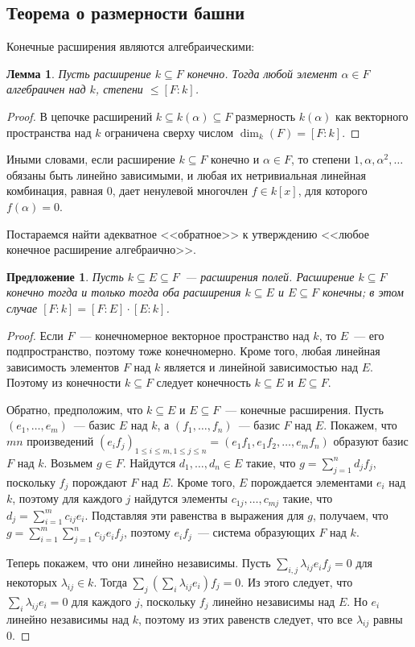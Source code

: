 \documentclass[a4paper,11pt]{scrartcl}
\theoremstyle{plain}
\newtheorem{proposition}[theorem]{Предложение}
\newtheorem{lemma}[theorem]{Лемма}
\theoremstyle{definition}
\newcommand\sseq{\subseteq}
\begin{document}
\subsection{Теорема о размерности башни}

Конечные расширения являются алгебраическими:

\begin{lemma}\label{finite_are_algebraic}
Пусть расширение $k\sseq F$ конечно. Тогда любой элемент $\alpha\in F$
алгебраичен над $k$, степени $\leq [F:k]$.
\end{lemma}
\begin{proof}
В цепочке расширений $k\sseq k(\alpha)\sseq F$ размерность $k(\alpha)$
как векторного пространства над $k$ ограничена сверху числом
$\dim_k(F)=[F:k]$.
\end{proof}

Иными словами, если расширение $k\sseq F$ конечно и $\alpha\in F$, то
степени $1,\alpha,\alpha^2,\dots$ обязаны быть линейно зависимыми, и
любая их нетривиальная линейная комбинация, равная $0$, дает ненулевой
многочлен $f\in k[x]$, для которого $f(\alpha)=0$.

Постараемся найти адекватное <<обратное>> к утверждению <<любое
конечное расширение алгебраично>>.

\begin{proposition}
Пусть $k\sseq E\sseq F$~--- расширения полей. Расширение $k\sseq F$
конечно тогда и только тогда оба расширения $k\sseq E$ и $E\sseq F$
конечны; в этом случае $[F:k]=[F:E]\cdot [E:k]$.
\end{proposition}
\begin{proof}
Если $F$~--- конечномерное векторное пространство над $k$, то $E$~---
его подпространство, поэтому тоже конечномерно. Кроме того, любая
линейная зависимость элементов $F$ над $k$ является и линейной
зависимостью над $E$. Поэтому из конечности $k\sseq F$ следует
конечность $k\sseq E$ и $E\sseq F$.

Обратно, предположим, что $k\sseq E$ и $E\sseq F$~--- конечные
расширения. Пусть $(e_1,\dots,e_m)$~--- базис $E$ над $k$, а
$(f_1,\dots,f_n)$~--- базис $F$ над $E$. Покажем, что $mn$
произведений $(e_if_j)_{1\leq i\leq m,1\leq j\leq n} =
(e_1f_1,e_1f_2,\dots,e_mf_n)$ образуют базис $F$ над $k$. Возьмем
$g\in F$. Найдутся $d_1,\dots,d_n\in E$ такие, что
$g=\sum_{j=1}^nd_jf_j$, поскольку $f_j$ порождают $F$ над $E$. Кроме
того, $E$ порождается элементами $e_i$ над $k$, поэтому для каждого
$j$ найдутся элементы $c_{1j},\dots,c_{mj}$ такие, что $d_j=\sum_{i=1}^m
c_{ij}e_i$. Подставляя эти равенства в выражения для $g$, получаем,
что $g=\sum_{i=1}^m\sum_{j=1}^n c_{ij}e_if_j$, поэтому $e_if_j$~---
система образующих $F$ над $k$.

Теперь покажем, что они линейно независимы. Пусть
$\sum_{i,j}\lambda_{ij}e_if_j=0$ для некоторых $\lambda_{ij}\in k$.
Тогда $\sum_j(\sum_i\lambda_{ij}e_i)f_j=0$. Из этого следует, что
$\sum_i\lambda_{ij}e_i=0$ для каждого $j$, поскольку $f_j$ линейно
независимы над $E$. Но $e_i$ линейно независимы над $k$, поэтому из
этих равенств следует, что все $\lambda_{ij}$ равны 0.
\end{proof}
\end{document}
